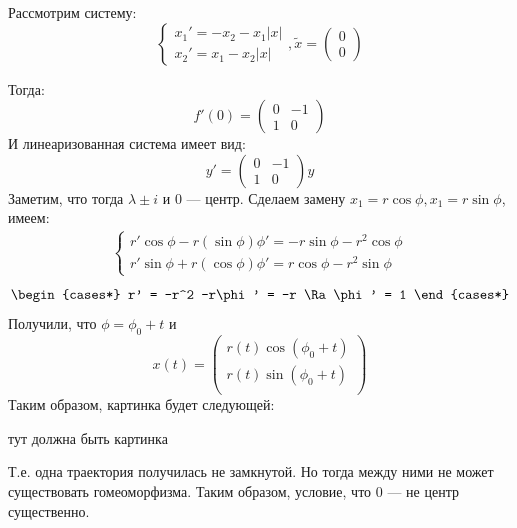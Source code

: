 \begin{example}
    Рассмотрим систему:
    \begin{equation*}
        \begin{cases*}
            x_1' = -x_2 - x_1|x| \\
            x_2' = x_1 - x_2|x|
        \end{cases*}, \tilde{x} = \left( \begin{array}{c}
            0 \\
            0
        \end{array} \right)
    \end{equation*}

    Тогда:
    \[f'(0) = \left( \begin{array}{cc}
        0 & -1 \\
        1 & 0
    \end{array} \right)\]
    И линеаризованная система имеет вид:
    \[y' = \left( \begin{array}{cc}
        0 & -1 \\
        1 & 0
    \end{array} \right)y\]
    Заметим, что тогда \(\lambda \pm i\) и \(0\) --- центр. Сделаем замену \(x_1 = r\cos\phi, x_1 = r\sin\phi\), имеем:
    \begin{eqnarray*}
        \begin{cases*}
            r'\cos\phi - r(\sin\phi)\phi' = -r\sin\phi - r^2\cos\phi \\
            r'\sin\phi + r(\cos\phi)\phi' = r\cos\phi - r^2\sin\phi
        \end{cases*}
    \end{eqnarray*}
    \begin{eqnarray*}
        \begin{cases*}
            r' = -r^2
            -r\phi' = -r \Ra \phi' = 1
        \end{cases*}
    \end{eqnarray*}
    Получили, что \(\phi = \phi_0 + t\) и 
    \[x(t) = \left( \begin{array}{c}
        r(t)\cos(\phi_0 + t) \\
        r(t)\sin(\phi_0 + t) \\
    \end{array} \right)\]
    Таким образом, картинка будет следующей:
    \begin{center}
        тут должна быть картинка
    \end{center}
    Т.е. одна траектория получилась не замкнутой. Но тогда между ними не может существовать гомеоморфизма. Таким образом, условие, что 0 --- не центр существенно.
\end{example}

